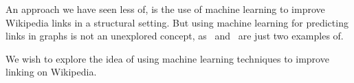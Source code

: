An approach we have seen less of, is the use of machine learning to improve Wikipedia links in a structural setting. But using machine learning for predicting links in graphs is not an unexplored concept, as~\cite{tang2015line} and~\cite{al2006link} are just two examples of.

We wish to explore the idea of using machine learning techniques to improve linking on Wikipedia. 


